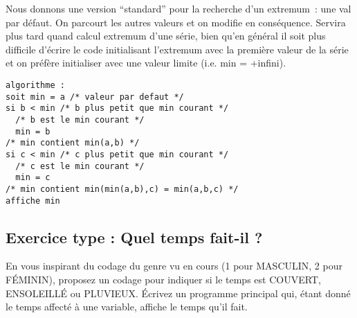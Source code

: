 \begin{correction}
Nous donnons une version ``standard'' pour la recherche d'un
extremum~: une val par défaut. On parcourt les autres valeurs et on
modifie en
conséquence. Servira plus tard quand calcul extremum d'une série, bien
qu'en général il soit plus difficile d'écrire le code initialisant
l'extremum avec la première valeur de la série et on préfère
initialiser avec une valeur limite (i.e. min = +infini).  
\begin{verbatim}
algorithme :
soit min = a /* valeur par defaut */
si b < min /* b plus petit que min courant */
  /* b est le min courant */
  min = b
/* min contient min(a,b) */
si c < min /* c plus petit que min courant */
  /* c est le min courant */
  min = c
/* min contient min(min(a,b),c) = min(a,b,c) */
affiche min
\end{verbatim}
\begin{listing}{1}
\end{listing}
\end{correction}


\subsection{Exercice type : Quel temps fait-il ?}

En vous inspirant du codage du genre vu en cours (1 pour MASCULIN, 2
pour FÉMININ), proposez un codage pour indiquer si le temps est
COUVERT, ENSOLEILLÉ ou PLUVIEUX.
Écrivez un programme principal qui, étant donné le temps affecté à une
variable, affiche le temps qu'il fait.

